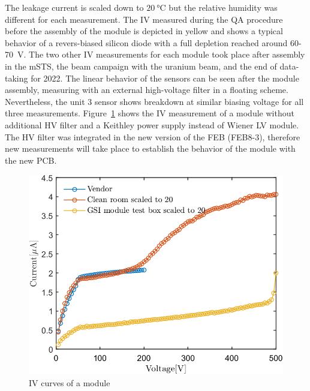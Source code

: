 The leakage current is scaled down to $\SI{20}{\celsius}$ but the relative humidity was different for each measurement. The IV measured during the QA procedure before the assembly of the module is depicted in yellow and shows a typical behavior of a revers-biased silicon diode with a full depletion reached around 60-70~V. The two other IV measurements for each module took place after assembly in the \gls{mSTS}, the beam campaign with the uranium beam, and the end of data-taking for 2022. The linear behavior of the sensors can be seen after the module assembly, measuring with an external high-voltage filter in a floating scheme. Nevertheless, the unit 3 sensor shows breakdown at similar biasing voltage for all three measurements. Figure~\ref{fig_IV_good} shows the IV measurement of a module without additional \gls{HV} filter and a Keithley power supply instead of Wiener \gls{LV} module. The \gls{HV} filter was integrated in the new version of the \gls{FEB} (FEB8-3), therefore new measurements will take place to establish the behavior of the module with the new PCB.

\begin{figure}[!h]
\centering
\includegraphics[width=0.5\columnwidth]{Chapter5/DCS/images/IV/30304Whole.png}
\caption{IV curves of a module}
\label{fig_IV_good}
\end{figure}

\newpage
